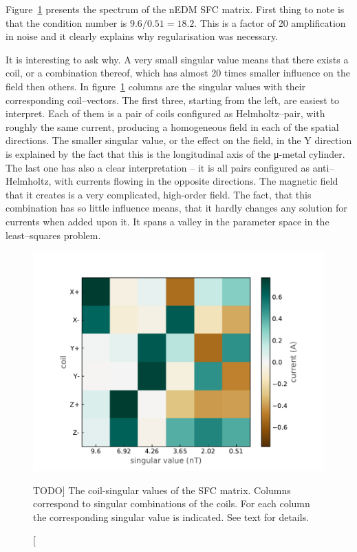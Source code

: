 Figure~\ref{fig:nEDM_SFC_svd} presents the spectrum of the nEDM SFC matrix. First thing to note is that the condition number is $9.6 / 0.51 = 18.2$. This is a factor of 20 amplification in noise and it clearly explains why regularisation was necessary.

It is interesting to ask why. A very small singular value means that there exists a coil, or a combination thereof, which has almost 20 times smaller influence on the field then others. In figure~\ref{fig:nEDM_SFC_svd} columns are the singular values with their corresponding coil--vectors. The first three, starting from the left, are easiest to interpret. Each of them is a pair of coils configured as Helmholtz--pair, with roughly the same current, producing a homogeneous field in each of the spatial directions. The smaller singular value, or the effect on the field, in the Y direction is explained by the fact that this is the longitudinal axis of the μ-metal cylinder. The last one has also a clear interpretation -- it is all pairs configured as anti--Helmholtz, with currents flowing in the opposite directions. The magnetic field that it creates is a very complicated, high-order field. The fact, that this combination has so little influence means, that it hardly changes any solution for currents when added upon it. It spans a valley in the parameter space in the least--squares problem.

\begin{figure}
  \centering
  \includegraphics[width=.7\linewidth]{gfx/nEDM_SFC/coil-singular_vectors_of_the_nEDM_SFC_matrix}
  \caption
  [TODO]
  {The coil-singular values of the SFC matrix. Columns correspond to singular combinations of the coils. For each column the corresponding singular value is indicated. See text for details.}
  \label{fig:nEDM_SFC_svd}
\end{figure}

